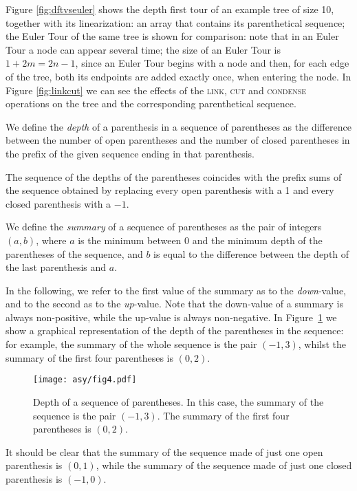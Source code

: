 \documentclass[a4paper,USenglish]{lipics}
\begin{document}
Figure \ref{fig:dftvseuler} shows the depth first tour of an example tree of size 10, together with its linearization: an array that contains its parenthetical sequence; the Euler Tour of the same tree is shown for comparison: note that in an Euler Tour a node can appear several time; the size of an Euler Tour is $1+2m=2n-1$, since an Euler Tour begins with a node and then, for each edge of the tree, both its endpoints are added exactly once, when entering the node. In Figure \ref{fig:linkcut} we can see the effects of the \textsc{link}, \textsc{cut} and \textsc{condense} operations on the tree and the corresponding parenthetical sequence.	

		\begin{definition}
		We define the \emph{depth} of a parenthesis in a sequence of parentheses as the difference between the number of open parentheses and the number of closed parentheses in the prefix of the given sequence ending in that  parenthesis.
		\end{definition}
		The sequence of the depths of the parentheses coincides with the prefix sums of the sequence obtained by replacing every open parenthesis with a 1 and every closed parenthesis with a $-1$.
		
		\begin{definition}
		We define the \emph{summary} of a sequence of parentheses as the pair of integers $(a,b)$, where $a$ is the minimum between 0 and the minimum depth of the parentheses of the sequence, and $b$ is equal to the difference between the depth of the last parenthesis and $a$.
		\end{definition}
In the following, we  refer to the first value of the summary as to the \emph{down}-value, and to the second as to the \emph{up}-value. Note that the down-value of a summary is always non-positive, while the up-value is always non-negative. In Figure~\ref{fig:basic summary} we show a graphical representation of the depth of the parentheses in the sequence: for example, the summary of the whole sequence is the pair $(-1, 3)$, whilst the summary of the first four parentheses is $(0, 2)$.
		\begin{figure}[t]\centering 
			\texttt{[image: asy/fig4.pdf]}\\
			\caption{Depth of a sequence of parentheses. In this case, the summary of the sequence is the pair $(-1, 3)$. The summary of the first four parentheses is $(0, 2)$.\label{fig:basic summary}}


		\end{figure}
		It should be clear that the summary of the sequence made of just one open parenthesis is $(0,1)$, while the summary of the sequence made of just one closed parenthesis is $(-1,0)$.
		
\end{document}
